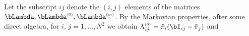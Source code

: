 \documentclass[10pt, twocolumn]{IEEEtran}
\begin{document}
Let the subscript $ij$ denote the $(i,j)$ elements of the matrices
$\bLambda, \bLambda^{\scriptscriptstyle{(0)}},
\bLambda^{\scriptscriptstyle{(m)}}$. By the Markovian properties, after some direct algebra, 
for $i,\,j = 1, \ldots ,{N^2}$ we obtain $\Lambda
^{\scriptscriptstyle{(0)}}_{ij} = {{\tilde \pi }_i}( {{{\bI}_{ij}} -
  {{\tilde \pi }_j}} )$ and
\end{document}
